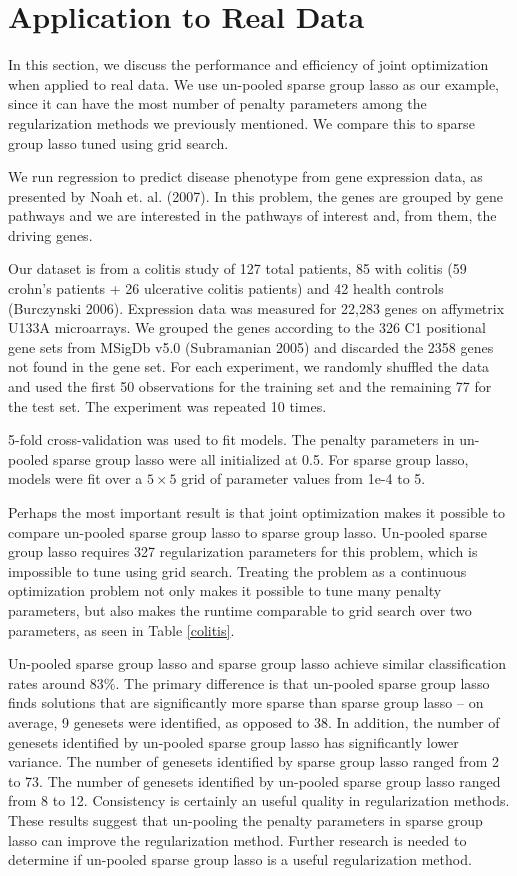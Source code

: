 \documentclass[10pt,letterpaper]{article}
\begin{document}
\section{Application to Real Data}
In this section, we discuss the performance and efficiency of joint optimization when applied to real data. We use un-pooled sparse group lasso as our example, since it can have the most number of penalty parameters among the regularization methods we previously mentioned. We compare this to sparse group lasso tuned using grid search.

We run regression to predict disease phenotype from gene expression data, as presented by Noah et. al. (2007). In this problem, the genes are grouped by gene pathways and we are interested in the pathways of interest and, from them, the driving genes.

Our dataset is from a colitis study of 127 total patients, 85 with colitis (59 crohn's patients + 26 ulcerative colitis patients) and 42 health controls (Burczynski 2006). Expression data was measured for 22,283 genes on affymetrix U133A microarrays. We grouped the genes according to the 326 C1 positional gene sets from MSigDb v5.0 (Subramanian 2005) and discarded the 2358 genes not found in the gene set. For each experiment, we randomly shuffled the data and used the first 50 observations for the training set and the remaining 77 for the test set. The experiment was repeated 10 times.

5-fold cross-validation was used to fit models. The penalty parameters in un-pooled sparse group lasso were all initialized at 0.5. For sparse group lasso, models were fit over a $5 \times 5$ grid of parameter values from 1e-4 to 5.

Perhaps the most important result is that joint optimization makes it possible to compare un-pooled sparse group lasso to sparse group lasso. Un-pooled sparse group lasso requires 327 regularization parameters for this problem, which is impossible to tune using grid search. Treating the problem as a continuous optimization problem not only makes it possible to tune many penalty parameters, but also makes the runtime comparable to grid search over two parameters, as seen in Table \ref{colitis}.

Un-pooled sparse group lasso and sparse group lasso achieve similar classification rates around 83\%. The primary difference is that un-pooled sparse group lasso finds solutions that are significantly more sparse than sparse group lasso -- on average, 9 genesets were identified, as opposed to 38. In addition, the number of genesets identified by un-pooled sparse group lasso has significantly lower variance. The number of genesets identified by sparse group lasso ranged from 2 to 73. The number of genesets identified by un-pooled sparse group lasso ranged from 8 to 12. Consistency is certainly an useful quality in regularization methods. These results suggest that un-pooling the penalty parameters in sparse group lasso can improve the regularization method. Further research is needed to determine if un-pooled sparse group lasso is a useful regularization method.
\end{document}
